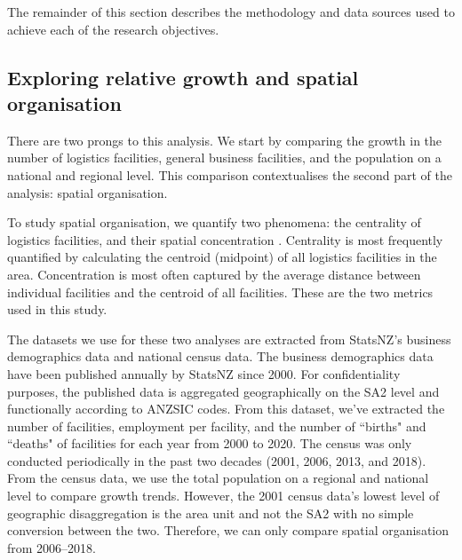 \documentclass[3p, a4paper, authoryear, 11pt, fleqn, review]{elsarticle}
\newcommand{\nmt}[1]{{\color{ForestGreen}{~(nmt: #1)}}}
\begin{document}
\nmt{include here a statement about the temporal novelty of our methodology}

The remainder of this section describes the methodology and data sources used to achieve each of the research objectives.

\subsection{Exploring relative growth and spatial organisation}
There are two prongs to this analysis. We start by comparing the growth in the number of logistics facilities, general business facilities, and the population on a national and regional level. This comparison contextualises the second part of the analysis: spatial organisation. 

To study spatial organisation, we quantify two phenomena: the centrality of logistics facilities, and their spatial concentration \citep{Kang2020}. Centrality is most frequently quantified by calculating the centroid (midpoint) of all logistics facilities in the area. Concentration is most often captured by the average distance between individual facilities and the centroid of all facilities. These are the two metrics used in this study. 

The datasets we use for these two analyses are extracted from \ac{StatsNZ}'s business demographics data and national census data. The business demographics data have been published annually by \ac{StatsNZ} since 2000. For confidentiality purposes, the published data is aggregated geographically on the \ac{SA2} level and functionally according to \ac{ANZSIC} codes. From this dataset, we've extracted the number of facilities, employment per facility, and the number of ``births" and ``deaths" of facilities for each year from 2000 to 2020. The census was only conducted periodically in the past two decades (2001, 2006, 2013, and 2018). From the census data, we use the total population on a regional and national level to compare growth trends. However, the 2001 census data's lowest level of geographic disaggregation is the area unit and not the \ac{SA2} with no simple conversion between the two. Therefore, we can only compare spatial organisation from 2006--2018. \nmt{I think I could work around this if I have the area unit geographic data. I should look.}


\end{document}
